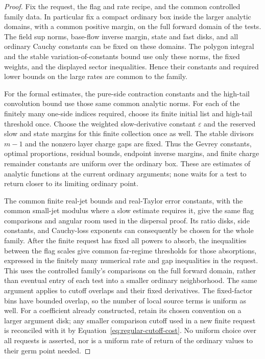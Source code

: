 \begin{proof}
Fix the request, the flag and rate recipe, and the common controlled
family data.  In particular fix a compact ordinary box inside the
larger analytic domains, with a common positive margin, on the full
forward domain of the tests.  The field sup norms, base-flow inverse
margin, state and fast disks, and all ordinary Cauchy constants can
be fixed on these domains.  The polygon integral and the stable
variation-of-constants bound use only these norms, the fixed weights,
and the displayed sector inequalities.  Hence their constants and
required lower bounds on the large rates are common to the family.

For the formal estimates, the pure-side contraction constants and
the high-tail convolution bound use those same common analytic
norms.  For each of the finitely many one-side indices required,
choose its finite initial list and high-tail threshold once.  Choose
the weighted slow-derivative constant $\varepsilon$ and the reserved
slow and state margins for this finite collection once as well.
The stable divisors $m-1$ and the nonzero layer charge gaps are
fixed.  Thus the Gevrey constants, optimal proportions, residual
bounds, endpoint inverse margins, and finite charge remainder
constants are uniform over the ordinary box.  These are estimates
of analytic functions at the current ordinary arguments; none
waits for a test to return closer to its limiting ordinary point.

The common finite real-jet bounds and real-Taylor error constants,
with the common small-jet modulus where a slow estimate requires it,
give the same flag comparisons and angular room used in the dispersal
proof.  Its ratio disks, side constants, and Cauchy-loss exponents
can consequently be chosen for the whole family.  After the finite
request has fixed all powers to absorb, the inequalities between
the flag scales give common far-regime thresholds for those
absorptions, expressed in the finitely many numerical rate and gap
inequalities in the request.  This uses the controlled family's comparisons on the
full forward domain, rather than eventual entry of each test into
a smaller ordinary neighborhood.  The same argument applies to
cutoff overlaps and their fixed derivatives.  The fixed-factor bins
have bounded overlap, so the number of local source terms is uniform
as well.  For a coefficient
already constructed, retain its chosen convention on a larger
argument disk; any smaller comparison cutoff used in a new finite
request is reconciled with it by
Equation~\eqref{eq:regular-cutoff-cost}.  No uniform choice over
all requests is asserted, nor is a uniform rate of return of the
ordinary values to their germ point needed.


\end{proof}
